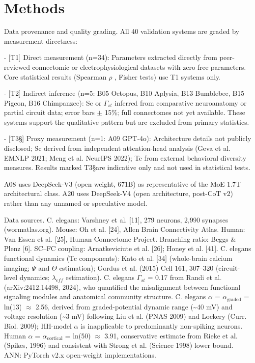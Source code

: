 \documentclass[a4paper,12pt]{article}
\begin{document}
\section{Methods}

Data provenance and quality grading. All 40 validation systems are graded by measurement directness:

- [T1] Direct measurement (n=34): Parameters extracted directly from peer-reviewed connectomic or electrophysiological datasets with zero free parameters. Core statistical results (Spearman  $\rho$ , Fisher tests) use T1 systems only.

- [T2\dag] Indirect inference (n=5: B05 Octopus, B10 Aplysia, B13 Bumblebee, B15 Pigeon, B16 Chimpanzee): Sc or $\Gamma_{st}$ inferred from comparative neuroanatomy or partial circuit data; error bars  $\pm$ 15\%; full connectomes not yet available. These systems support the qualitative pattern but are excluded from primary statistics.

- [T3\S] Proxy measurement (n=1: A09 GPT-4o): Architecture details not publicly disclosed; Sc derived from independent attention-head analysis (Geva et al. EMNLP 2021; Meng et al. NeurIPS 2022); Tc from external behavioral diversity measures. Results marked T3\S are indicative only and not used in statistical tests.

A08 uses DeepSeek-V3 (open weight, 671B) as representative of the MoE 1.7T architectural class. A20 uses DeepSeek-V4 (open architecture, post-CoT v2) rather than any unnamed or speculative model.

Data sources.
C. elegans: Varshney et al. [11], 279 neurons, 2,990 synapses (wormatlas.org).
Mouse: Oh et al. [24], Allen Brain Connectivity Atlas.
Human: Van Essen et al. [25], Human Connectome Project.
Branching ratio: Beggs \& Plenz [6].
SC--FC coupling: Arnatkeviciute et al. [26]; Honey et al. [41].
C. elegans functional dynamics (Tc components): Kato et al. [34] (whole-brain calcium imaging;  $\Psi$  and $\Theta$ estimation); Gordus et al. (2015) Cell 161, 307--320 (circuit-level dynamics; $\lambda_{eff}$ estimation).
C. elegans $\Gamma_{st}$ = 0.17 from Randi et al. (arXiv:2412.14498, 2024), who quantified the misalignment between functional signaling modules and anatomical community structure.
C. elegans  $\alpha$  = $\alpha_{\text{graded}}$ = ln(13)  $\approx$  2.56, derived from graded-potential dynamic range (\textasciitilde{}40 mV) and voltage resolution (\textasciitilde{}3 mV) following Liu et al. (PNAS 2009) and Lockery (Curr.
Biol. 2009); HH-model  $\alpha$  is inapplicable to predominantly non-spiking neurons.
Human  $\alpha$  = $\alpha_{\text{cortical}}$ = ln(50)  $\approx$  3.91, conservative estimate from Rieke et al. (Spikes, 1996) and consistent with Strong et al. (Science 1998) lower bound.
ANN: PyTorch v2.x open-weight implementations.
\end{document}
